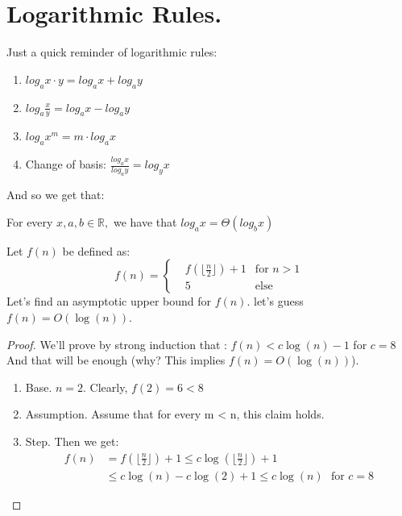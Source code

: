\section{Logarithmic Rules.}

Just a quick reminder of logarithmic rules:
\begin{enumerate}
\item $log_{a}x\cdot y=log_{a}x+log_{a}y$
\item $log_{a}\frac{x}{y}=log_{a}x-log_{a}y$
\item $log_{a}x^{m}=m\cdot log_{a}x$
\item Change of basis: $\frac{log_{a}x}{log_{a}y}=log_{y}x$
\end{enumerate}
And so we get that:
\begin{remark}
For every $x,a,b\in\mathbb{R},$ we have that $log_{a}x=\Theta(log_{b}x)$
\end{remark}

\begin{example} Let \(f(n)\) be defined as:
\begin{equation*}
f(n) = \left\{ \begin{array}{rcl}
& f\left( \lfloor  \frac{n}{2} \rfloor \right) + 1 & \mbox{for }  n > 1  \\
& 5 & \mbox{else}  
\end{array}\right.
\end{equation*}
Let’s find an asymptotic upper bound for \(f(n)\). let's guess \( f(n) = O(\log(n)) \).

\begin{proof}  We’ll prove by strong induction that : \(f(n) < c \log(n) - 1\) for \(c =8 \) And that will be enough (why? This implies \(f(n) = O(\log(n))\)).
  \begin{enumerate}
    \item      Base. \(n = 2\). Clearly, \(f(2) = 6 < 8 \)
    \item      Assumption. Assume that for every m < n, this claim holds.
    \item      Step. Then we get:
      \begin{equation*} \begin{split}
	  f(n) &= f\left( \lfloor  \frac{n}{2} \rfloor \right) + 1 \le c\log\left(  \lfloor\frac{n}{2}\rfloor\right)  + 1  \\ & \le c\log\left(n\right) - c\log\left(2\right) + 1 
	  \le c\log\left(n\right) \ \ \ \text{for } c = 8
	\end{split}
      \end{equation*}
  \end{enumerate}
\end{proof}
\end{example}

